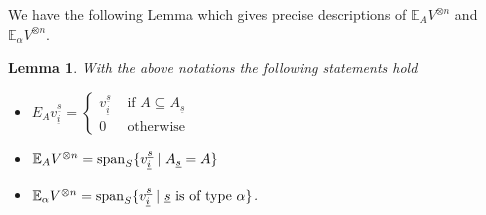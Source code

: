 \documentclass[10pt,a4,twoside,hidelinks,rm]{article}
\newcommand\be{\mathbb{E}}
\theoremstyle{plain}
\newtheorem{lem}[teo]{Lemma}
\begin{document}
\medskip
We have the following Lemma which gives precise descriptions of $ \be_A   V^{\otimes n} $
and $ \be_\alpha   V^{\otimes n}$.
\begin{lem}\label{16}
With the above notations the following statements hold 
  \begin{itemize}
\setlength\itemsep{-0.5em}
\item[(1)] $ E_A v_{\underline{i}}^{\underline{s}} = \left\{ \begin{array}{ll}
v_{\underline{i}}^{\underline{s}} & \mbox{ if } A \subseteq  A_{\underline{s}} \\
0 & \mbox{ otherwise }  \end{array} \right.$
  \newline
\item[(2)] $ \be_A   V^{\otimes n} = {\rm span}_S
\{  v_{\underline{i}}^{\underline{s}} \mid   A_{\underline{s}} = A  \} $
  \newline
\item[(3)] $  \be_{\alpha}   V^{\otimes n} = {\rm span}_S
\{  v_{\underline{i}}^{\underline{s}} \mid  \underline{s} \mbox{ is of type } \alpha \} $.
\end{itemize}
\end{lem}
\end{document}
